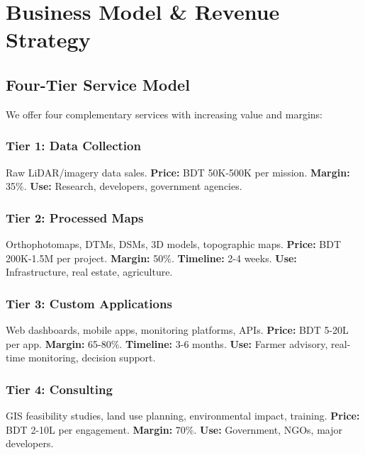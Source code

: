 
\chapter{Business Model \& Revenue Strategy}

\section{Four-Tier Service Model}

We offer four complementary services with increasing value and margins:

\subsection{Tier 1: Data Collection}

Raw LiDAR/imagery data sales. \textbf{Price:} BDT 50K-500K per mission. \textbf{Margin:} 35\%. \textbf{Use:} Research, developers, government agencies.

\subsection{Tier 2: Processed Maps}

Orthophotomaps, DTMs, DSMs, 3D models, topographic maps. \textbf{Price:} BDT 200K-1.5M per project. \textbf{Margin:} 50\%. \textbf{Timeline:} 2-4 weeks. \textbf{Use:} Infrastructure, real estate, agriculture.

\subsection{Tier 3: Custom Applications}

Web dashboards, mobile apps, monitoring platforms, APIs. \textbf{Price:} BDT 5-20L per app. \textbf{Margin:} 65-80\%. \textbf{Timeline:} 3-6 months. \textbf{Use:} Farmer advisory, real-time monitoring, decision support.

\subsection{Tier 4: Consulting}

GIS feasibility studies, land use planning, environmental impact, training. \textbf{Price:} BDT 2-10L per engagement. \textbf{Margin:} 70\%. \textbf{Use:} Government, NGOs, major developers.

